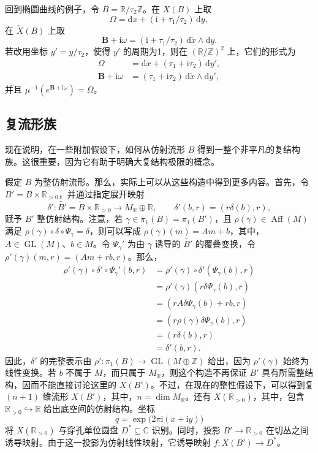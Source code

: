 \begin{example}\label{ex:6.27}
回到椭圆曲线的例子，令 $B=\mathbb R/\tau_2\mathbb Z$。在 $X(B)$ 上取
\[
\Omega=\mathrm dx+(\mathrm i+\tau_1/\tau_2)\,\mathrm dy,
\]
在 $\check X(B)$ 上取
\[
\mathbf B+\mathrm i\omega
=(\mathrm i+\tau_1/\tau_2)\,\mathrm d\check x\wedge\mathrm dy.
\]
若改用坐标 $y'=y/\tau_2$，使得 $y'$ 的周期为1，则在 $(\mathbb R/\mathbb Z)^2$ 上，它们的形式为
\[
\begin{aligned}
\Omega&=\mathrm dx+(\tau_1+\mathrm i\tau_2)\,\mathrm dy',\\
\mathbf B+\mathrm i\omega&=(\tau_1+\mathrm i\tau_2)\,
\mathrm d\check x\wedge\mathrm dy',
\end{aligned}
\]
并且 $\mu^{-1}(e^{\mathbf B+\mathrm i\omega})=\Omega$。
\end{example}

\subsection{复流形族}\label{sec:6.2.4}

现在说明，在一些附加假设下，如何从仿射流形 $B$ 得到一整个非平凡的复结构族。这很重要，因为它有助于明确大复结构极限的概念。

假定 $B$ 为整仿射流形。那么，实际上可以从这些构造中得到更多内容。首先，令 $B'=B\times\mathbb R_{>0}$，并通过指定展开映射
\[
\delta'\colon\widetilde{B'}=\widetilde B\times\mathbb R_{>0}
\longrightarrow M_{\mathbb R}\oplus\mathbb R,
\qquad
\delta'(b,r)=(r\delta(b),r),
\]
赋予 $B'$ 整仿射结构。注意，若 $\gamma\in\pi_1(B)=\pi_1(B')$，且 $\rho(\gamma)\in\operatorname{Aff}(M)$ 满足 $\rho(\gamma)\circ\delta\circ\Psi_\gamma=\delta$，则可以写成 $\rho(\gamma)(m)=Am+b$，其中，$A\in\operatorname{GL}(M)$、$b\in M$。令 $\Psi_\gamma'$ 为由 $\gamma$ 诱导的 $\widetilde{B'}$ 的覆叠变换，令 $\rho'(\gamma)(m,r)=(Am+rb,r)$。那么，
\[
\begin{aligned}
\rho'(\gamma)\circ\delta'\circ\Psi_\gamma'(b,r)
&=\rho'(\gamma)\circ\delta'(\Psi_\gamma(b),r)\\
&=\rho'(\gamma)(r\delta\Psi_\gamma(b),r)\\
&=(rA\delta\Psi_\gamma(b)+rb,r)\\
&=(r\rho(\gamma)\delta\Psi_\gamma(b),r)\\
&=(r\delta(b),r)\\
&=\delta'(b,r).
\end{aligned}
\]
因此，$\delta'$ 的完整表示由 $\rho'\colon\pi_1(B)\to\operatorname{GL}(M\oplus\mathbb Z)$ 给出，因为 $\rho'(\gamma)$ 始终为线性变换。若 $b$ 不属于 $M$，而只属于 $M_{\mathbb R}$，则这个构造不再保证 $B'$ 具有所需整结构，因而不能直接讨论这里的 $X(B')$。不过，在现在的整性假设下，可以得到复 $(n+1)$ 维流形 $X(B')$，其中，$n=\dim M_{\mathbb R}$。还有 $X(\mathbb R_{>0})$，其中，包含 $\mathbb R_{>0}\hookrightarrow\mathbb R$ 给出底空间的仿射结构。坐标
\[
q=\exp\bigl(2\pi\mathrm i(x+\mathrm i y)\bigr)
\]
将 $X(\mathbb R_{>0})$ 与穿孔单位圆盘 $D^*\subseteq\mathbb C$ 识别。同时，投影 $B'\to\mathbb R_{>0}$ 在切丛之间诱导映射。由于这一投影为仿射线性映射，它诱导映射 $f\colon X(B')\to D^*$。

